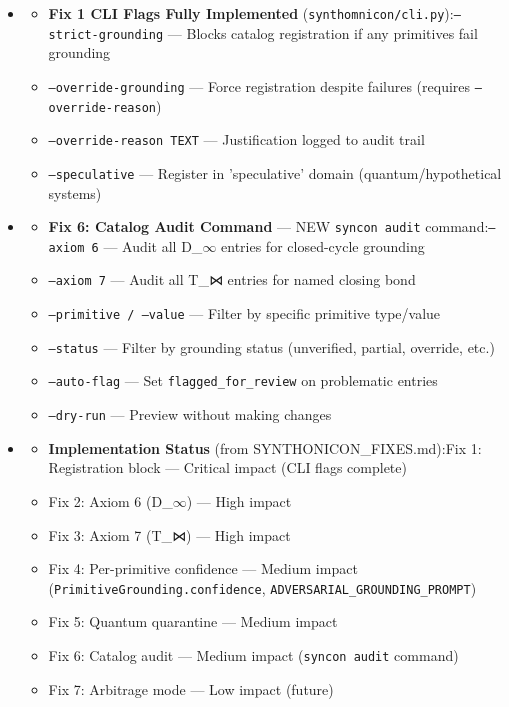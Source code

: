 \documentclass[12pt,a4paper]{article}
\begin{document}
\begin{itemize}
\begin{itemize}
    \item 
    \begin{itemize}
    \item \textbf{Fix 1 CLI Flags Fully Implemented} (\texttt{synthomnicon/cli.py}):\texttt{--strict-grounding} --- Blocks catalog registration if any primitives fail grounding
    \item \texttt{--override-grounding} --- Force registration despite failures (requires \texttt{--override-reason})
    \item \texttt{--override-reason TEXT} --- Justification logged to audit trail
    \item \texttt{--speculative} --- Register in 'speculative' domain (quantum/hypothetical systems)
\end{itemize}

    \item 
    \begin{itemize}
    \item \textbf{Fix 6: Catalog Audit Command} --- NEW \texttt{syncon audit} command:\texttt{--axiom 6} --- Audit all D\_$\infty$ entries for closed-cycle grounding
    \item \texttt{--axiom 7} --- Audit all T\_⋈ entries for named closing bond
    \item \texttt{--primitive / --value} --- Filter by specific primitive type/value
    \item \texttt{--status} --- Filter by grounding status (unverified, partial, override, etc.)
    \item \texttt{--auto-flag} --- Set \texttt{flagged\_for\_review} on problematic entries
    \item \texttt{--dry-run} --- Preview without making changes
\end{itemize}

    \item 
    \begin{itemize}
    \item \textbf{Implementation Status} (from SYNTHONICON\_FIXES.md):Fix 1: Registration block --- Critical impact  (CLI flags complete)
    \item Fix 2: Axiom 6 (D\_$\infty$) --- High impact 
    \item Fix 3: Axiom 7 (T\_⋈) --- High impact 
    \item Fix 4: Per-primitive confidence --- Medium impact  (\texttt{PrimitiveGrounding.confidence}, \texttt{ADVERSARIAL\_GROUNDING\_PROMPT})
    \item Fix 5: Quantum quarantine --- Medium impact 
    \item Fix 6: Catalog audit --- Medium impact  (\texttt{syncon audit} command)
    \item Fix 7: Arbitrage mode --- Low impact (future)
\end{itemize}


\end{itemize}
\end{itemize}
\end{document}

